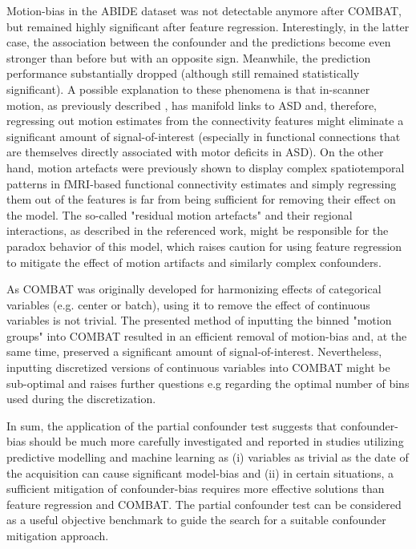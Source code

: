 \documentclass{article}
\begin{document}
Motion-bias in the ABIDE dataset was not detectable anymore after COMBAT, but remained highly significant after feature regression.
Interestingly, in the latter case, the association between the confounder and the predictions become even stronger than before but with an opposite sign. Meanwhile, the prediction performance substantially dropped (although still remained statistically significant). 
A possible explanation to these phenomena is that in-scanner motion, as previously described \citep{fournier2010motor, anzulewicz2016toward}, has manifold links to ASD and, therefore, regressing out motion estimates from the connectivity features might eliminate a significant amount of signal-of-interest (especially in functional connections that are themselves directly associated with motor deficits in ASD).
On the other hand, motion artefacts were previously shown to display complex spatiotemporal patterns in fMRI-based functional connectivity estimates \citep{spisak2014voxel} and simply regressing them out of the features is far from being sufficient for removing their effect on the model. The so-called "residual motion artefacts" and their regional interactions, as described in the referenced work, might be responsible for the paradox behavior of this model, which raises caution for using feature regression to mitigate the effect of motion artifacts and similarly complex confounders.
 
 As COMBAT was originally developed for harmonizing effects of categorical variables (e.g. center or batch), using it to remove the effect of continuous variables is not trivial. The presented method of inputting the binned "motion groups" into COMBAT resulted in an efficient removal of motion-bias and, at the same time, preserved a significant amount of signal-of-interest. 
 Nevertheless, inputting discretized versions of continuous variables into COMBAT might be sub-optimal and raises further questions e.g regarding the optimal number of bins used during the discretization.
 
 In sum, the application of the partial confounder test suggests that confounder-bias should be much more carefully investigated and reported in studies utilizing predictive modelling and machine learning as (i) variables as trivial as the date of the acquisition can cause significant model-bias and (ii) in certain situations, a sufficient mitigation of confounder-bias requires more effective solutions than feature regression and COMBAT. The partial confounder test can be considered as a useful objective benchmark to guide the search for a suitable confounder mitigation approach.
 
\end{document}
